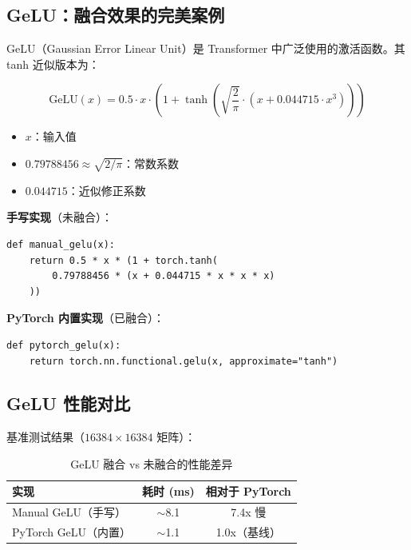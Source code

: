 \subsection{GeLU：融合效果的完美案例}

GeLU（Gaussian Error Linear Unit）是 Transformer 中广泛使用的激活函数。其 tanh 近似版本为：

$$\text{GeLU}(x) = 0.5 \cdot x \cdot \left(1 + \tanh\left(\sqrt{\frac{2}{\pi}} \cdot (x + 0.044715 \cdot x^3)\right)\right)$$

\begin{itemize}
    \item $x$：输入值
    \item $0.79788456 \approx \sqrt{2/\pi}$：常数系数
    \item $0.044715$：近似修正系数
\end{itemize}

\textbf{手写实现}（未融合）：

\begin{lstlisting}[caption={手写 GeLU（多个独立 CUDA 内核）}]
def manual_gelu(x):
    return 0.5 * x * (1 + torch.tanh(
        0.79788456 * (x + 0.044715 * x * x * x)
    ))
\end{lstlisting}

\textbf{PyTorch 内置实现}（已融合）：

\begin{lstlisting}[caption={PyTorch 内置 GeLU（单个 CUDA 内核）}]
def pytorch_gelu(x):
    return torch.nn.functional.gelu(x, approximate="tanh")
\end{lstlisting}

\subsection{GeLU 性能对比}

基准测试结果（$16384 \times 16384$ 矩阵）：

\begin{table}[H]
\centering
\begin{tabular}{lcc}
\toprule
\textbf{实现} & \textbf{耗时 (ms)} & \textbf{相对于 PyTorch} \\
\midrule
Manual GeLU（手写） & $\sim$8.1 & 7.4x 慢 \\
PyTorch GeLU（内置） & $\sim$1.1 & 1.0x（基线）\\
\bottomrule
\end{tabular}
\caption{GeLU 融合 vs 未融合的性能差异}
\end{table}

